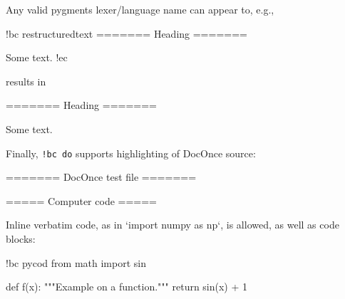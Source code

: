 \documentclass[%
oneside,                 %
final,                   %
10pt]{article}
\theoremstyle{definition}
\begin{document}
Any valid pygments lexer/language name can appear to, e.g.,









\bdo
!bc restructuredtext
=======
Heading
=======

Some text.
!ec

\edo

results in







\brestructuredtext
=======
Heading
=======

Some text.

\erestructuredtext





















Finally, \Verb?!bc do? supports highlighting of DocOnce source:





































\bdo
======= DocOnce test file =======

===== Computer code =====

Inline verbatim code, as in `import numpy as np`, is allowed, as well as
code blocks:

!bc pycod
from math import sin

def f(x):
    """Example on a function."""
    return sin(x) + 1
\end{document}
